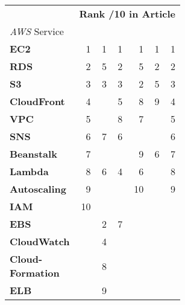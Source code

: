 

\begin{table}[h!]

	\begin{subtable}[t]{.52\textwidth}
		\footnotesize
		\begin{tabular}[t]{b{2 cm} r r r r r r} \toprule
			& \multicolumn{6}{c}{\textbf{Rank /10 in Article}}  \\ \cmidrule{2-7}
			{\textit{AWS} Service}            & {\cite{miner_top_2020}} & {\cite{dent_revealed_nodate}} & {\cite{house_top_2021}} & {\cite{noauthor_top_2021}} & {\cite{noauthor_top_2022}} & {\cite{noauthor_top_2022-1}} \\ \midrule
			\textbf{EC2}                      & 1    & 1    & 1    & 1    & 1    & 1    \\ \midrule[0.25pt]
			\textbf{RDS}                      & 2    & 5    & 2    & 5    & 2    & 2    \\ \midrule[0.25pt]
			\textbf{S3}                       & 3    & 3    & 3    & 2    & 5    & 3    \\ \midrule[0.25pt]
			\textbf{CloudFront}               & 4    &      & 5    & 8    & 9    & 4    \\ \midrule[0.25pt]
			\textbf{VPC}                      & 5    &      & 8    & 7    &      & 5    \\ \midrule[0.25pt]
			\textbf{SNS}                      & 6    & 7    & 6    &      &      & 6    \\ \midrule[0.25pt]
			\textbf{Beanstalk}                & 7    &      &      & 9    & 6    & 7    \\ \midrule[0.25pt]
			\textbf{Lambda}                   & 8    & 6    & 4    & 6    &      & 8    \\ \midrule[0.25pt]
			\textbf{Autoscaling}              & 9    &      &      & 10   &      & 9    \\ \midrule[0.25pt]
			\textbf{IAM}                      & 10   &      &      &      &      &      \\ \midrule[0.25pt]
			\textbf{EBS}                      &      & 2    & 7    &      &      &      \\ \midrule[0.25pt]
			\textbf{CloudWatch}               &      & 4    &      &      &      &      \\ \midrule[0.25pt]
			\textbf{Cloud-\newline Formation} &      & 8    &      &      &      &      \\ \midrule[0.25pt]
			\textbf{ELB}                      &      & 9    &      &      &      &      \\ \midrule[0.25pt]

\end{tabular}
\end{subtable}
\end{table}
